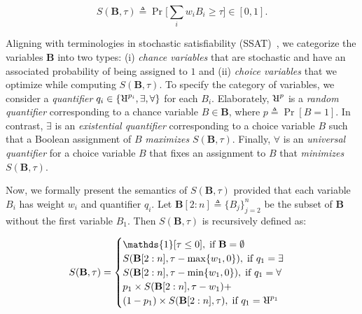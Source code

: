 \[S(\mathbf{B}, \tau) \triangleq \Pr\Big[\sum_{i} w_iB_i \ge \tau \Big] \in [0,1].\]

Aligning with terminologies in stochastic satisfiability (SSAT)~\cite{littman2001stochastic}, we categorize the variables $ \mathbf{B} $ into two types: (i) \textit{chance variables} that are stochastic and have an associated probability of being assigned to $ 1 $ and (ii) \textit{choice variables} that we  optimize while computing $ S(\mathbf{B}, \tau) $.  To specify the category of variables, we consider a \textit{quantifier} $ q_i \in \{\R^{p_i}, \exists, \forall\} $ for each $ B_i $. Elaborately, $ \R^{p} $ is a \textit{random quantifier} corresponding to a chance variable $ B \in \mathbf{B} $, where  $ p\triangleq \Pr[B = 1]$. In contrast, $ \exists $ is an \textit{existential quantifier} corresponding to a choice variable $ B $ such that a Boolean assignment of $ B $  \textit{maximizes}  $ S(\mathbf{B}, \tau) $. Finally, $ \forall $ is an \textit{universal quantifier} for a choice variable $ B $ that fixes an assignment to $ B $ that \textit{minimizes} $ S(\mathbf{B}, \tau) $. 
 
Now, we formally present the semantics of $ S(\mathbf{B}, \tau) $ provided that each variable $ B_i $ has weight $ w_i $ and quantifier $ q_i $. Let  $ \mathbf{B}[2:n] \triangleq \{B_j\}_{j=2}^{n} $ be the subset of $\mathbf{B}$ without the first variable $ B_1 $. Then $ S(\mathbf{B}, \tau) $ is recursively defined as:


\begin{align}\label{fvgm_eq:semantics_recurse}
  S(\mathbf{B},\tau) =
 \begin{cases}
 \mathds{1}[ \tau \le 0 ], \; \text{if } \textbf{B} = \emptyset \\
 S(\mathbf{B}[2:n],\tau - \max\{w_1, 0\}), \; \text{if } q_1 = \exists\\
 S(\mathbf{B}[2:n],\tau - \min\{w_1, 0\}), \; \text{if } q_1 = \forall\\
 p_1\times S(\mathbf{B}[2:n],\tau - w_1) +\\ (1-p_1)\times S(\mathbf{B}[2:n],\tau),\; \text{if } q_1 = \R^{p_1}
 \end{cases}
\end{align} 



